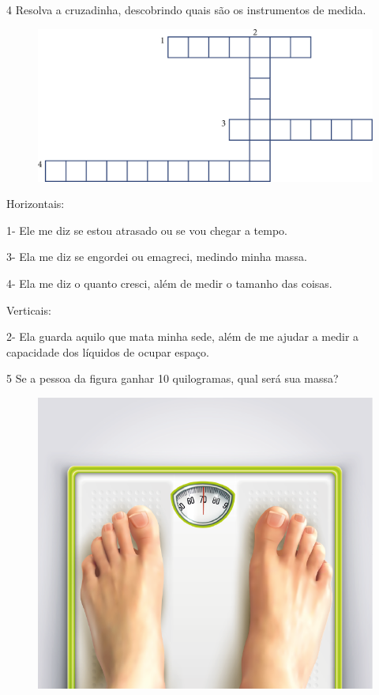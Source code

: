 \num{4} Resolva a cruzadinha, descobrindo quais são os instrumentos de medida.

\begin{figure}[H]
\centering
\includegraphics[scale=.74]{./media/image38.png}
\end{figure}

Horizontais:

1- Ele me diz se estou atrasado ou se vou chegar a tempo.

3- Ela me diz se engordei ou emagreci, medindo minha massa.

4- Ela me diz o quanto cresci, além de medir o tamanho das coisas.

Verticais:

2- Ela guarda aquilo que mata minha sede, além de me ajudar a medir a
capacidade dos líquidos de ocupar espaço.

\vspace*{1em}

\num{5} Se a pessoa da figura ganhar 10 quilogramas, qual será sua massa?


\begin{figure}[H]
\centering
\includegraphics[width=.5\textwidth]{./media/image32.png}
\end{figure}

